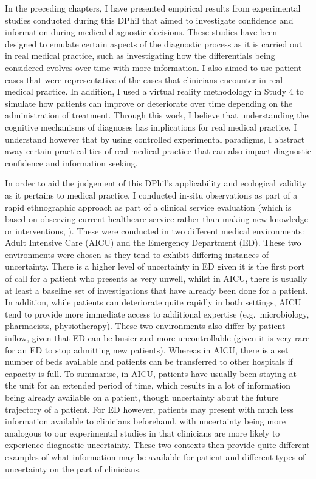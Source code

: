 \documentclass[a4paper, nobind]{templates/ociamthesis}
\begin{document}
\adjustmtc
{}

In the preceding chapters, I have presented empirical results from experimental studies conducted during this DPhil that aimed to investigate confidence and information during medical diagnostic decisions. These studies have been designed to emulate certain aspects of the diagnostic process as it is carried out in real medical practice, such as investigating how the differentials being considered evolves over time with more information. I also aimed to use patient cases that were representative of the cases that clinicians encounter in real medical practice. In addition, I used a virtual reality methodology in Study 4 to simulate how patients can improve or deteriorate over time depending on the administration of treatment. Through this work, I believe that understanding the cognitive mechanisms of diagnoses has implications for real medical practice. I understand however that by using controlled experimental paradigms, I abstract away certain practicalities of real medical practice that can also impact diagnostic confidence and information seeking.

\hfill\break
In order to aid the judgement of this DPhil's applicability and ecological validity as it pertains to medical practice, I conducted in-situ observations as part of a rapid ethnographic approach \autocite{vindrola-padros_quick_2018} as part of a clinical service evaluation (which is based on observing current healthcare service rather than making new knowledge or interventions, \textcite{twycross_service_2014}). These were conducted in two different medical environments: Adult Intensive Care (AICU) and the Emergency Department (ED). These two environments were chosen as they tend to exhibit differing instances of uncertainty. There is a higher level of uncertainty in ED given it is the first port of call for a patient who presents as very unwell, whilst in AICU, there is usually at least a baseline set of investigations that have already been done for a patient. In addition, while patients can deteriorate quite rapidly in both settings, AICU tend to provide more immediate access to additional expertise (e.g.~microbiology, pharmacists, physiotherapy). These two environments also differ by patient inflow, given that ED can be busier and more uncontrollable (given it is very rare for an ED to stop admitting new patients). Whereas in AICU, there is a set number of beds available and patients can be transferred to other hospitals if capacity is full. To summarise, in AICU, patients have usually been staying at the unit for an extended period of time, which results in a lot of information being already available on a patient, though uncertainty about the future trajectory of a patient. For ED however, patients may present with much less information available to clinicians beforehand, with uncertainty being more analogous to our experimental studies in that clinicians are more likely to experience diagnostic uncertainty. These two contexts then provide quite different examples of what information may be available for patient and different types of uncertainty on the part of clinicians.
\end{document}

